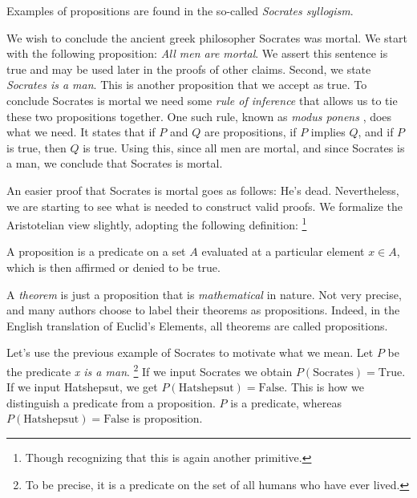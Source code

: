             Examples of propositions are found in the so-called
            \textit{Socrates syllogism}.
            \begin{example}
                We wish to conclude the ancient greek philosopher
                Socrates was mortal. We start with the following
                proposition: \textit{All men are mortal}. We assert this sentence is
                true and may be used later in the proofs of other claims. Second,
                we state \textit{Socrates is a man}. This is another proposition
                that we accept as true. To conclude Socrates is mortal we need some
                \textit{rule of inference} that allows us to tie these two
                propositions together. One such rule, known as
                \textit{modus ponens}%
                , does what we need. It states
                that if $P$ and $Q$ are propositions, if $P$ implies $Q$, and if $P$
                is true, then $Q$ is true. Using this, since all men are mortal, and
                since Socrates is a man, we conclude that Socrates is mortal.
            \end{example}
            An easier proof that Socrates is mortal goes as follows: He's dead.
            Nevertheless, we are starting to see what is needed to construct valid
            proofs. We formalize the Aristotelian view slightly, adopting the
            following definition:%
            \footnote{%
                Though recognizing that this is again another primitive.
            }
            \begin{definition}
                \label{def:Proposition}%
                A \gls{proposition} is a \gls{predicate} on a \gls{set} $A$
                evaluated at a particular element $x\in{A}$, which is then affirmed
                or denied to be true.%
            \end{definition}
            A \textit{theorem} is just a
            proposition that is \textit{mathematical} in nature. Not very precise,
            and many authors choose to label their theorems as propositions.
            Indeed, in the English translation of Euclid's Elements, all theorems
            are called propositions.
            \begin{example}
                Let's use the previous example of Socrates to motivate what we mean.
                Let $P$ be the predicate \textit{x is a man}.%
                \footnote{%
                    To be precise, it is a predicate on the set of all humans who
                    have ever lived.
                }
                If we input Socrates we obtain $P(\text{Socrates})=\text{True}$. If
                we input Hatshepsut, we get $P(\text{Hatshepsut})=\text{False}$.
                This is how we distinguish a predicate from a proposition. $P$ is
                a predicate, whereas $P(\text{Hatshepsut})=\text{False}$ is
                proposition.
            \end{example}
